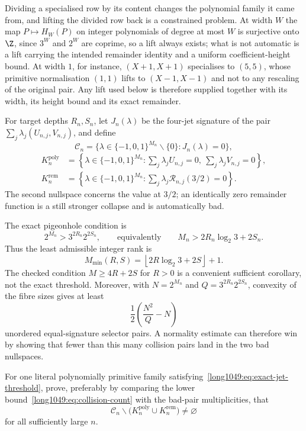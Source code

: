 Dividing a specialised row by its content changes the polynomial family it came
from, and lifting the divided row back is a constrained problem.  At width $W$ the map $P\mapsto H_W(P)$ on integer polynomials of
degree at most $W$ is surjective onto $\Z$, since $3^{W}$ and $2^{W}$ are
coprime, so a lift always exists; what is not automatic is a lift carrying the
intended remainder identity and a uniform coefficient-height bound.  At width
$1$, for instance, $(X+1,X+1)$ specialises to $(5,5)$, whose primitive
normalisation $(1,1)$ lifts to $(X-1,X-1)$ and not to any rescaling of the
original pair.  Any lift used below is therefore supplied together with its
width, its height bound and its exact remainder.

For target depths $R_n,S_n$, let $J_n(\lambda)$ be the four-jet signature of
the pair $\sum_j\lambda_j(U_{n,j},V_{n,j})$, and define
\[
 \mathcal C_n=
 \{\lambda\in\{-1,0,1\}^{M_n}\mathbin{\backslash}\{0\}:J_n(\lambda)=0\},
\]
\[
\begin{aligned}
 K_n^{\mathrm{poly}}
   &=\left\{\lambda\in\{-1,0,1\}^{M_n}:
       \sum_j\lambda_jU_{n,j}=0,\ \sum_j\lambda_jV_{n,j}=0\right\},\\
 K_n^{\mathrm{rem}}
   &=\left\{\lambda\in\{-1,0,1\}^{M_n}:
       \sum_j\lambda_j\mathcal R_{n,j}(3/2)=0\right\}.
\end{aligned}
\]
The second nullspace concerns the value at $3/2$; an identically zero
remainder function is a still stronger collapse and is automatically bad.

The exact pigeonhole condition is
\[
 2^{M_n}>3^{2R_n}2^{2S_n},
 \qquad\text{equivalently}\qquad
 M_n>2R_n\log_2 3+2S_n.
\tag{8.1}\label{long1049:eq:exact-jet-threshold}
\]
Thus the least admissible integer rank is
\[
 M_{\min}(R,S)=
 \left\lfloor2R\log_2 3+2S\right\rfloor+1.
\]
The checked condition $M\ge4R+2S$ for $R>0$ is a convenient sufficient
corollary, not the exact threshold.  Moreover, with
$N=2^{M_n}$ and $Q=3^{2R_n}2^{2S_n}$, convexity of the fibre sizes gives at
least
\[
 \frac12\left(\frac{N^2}{Q}-N\right)
\tag{8.2}\label{long1049:eq:collision-count}
\]
unordered equal-signature selector pairs.  A normality estimate can therefore
win by showing that fewer than this many collision pairs land in the two bad
nullspaces.

\begin{problem}\label{long1049:prob:escape}
For one literal polynomially primitive family
satisfying~\eqref{long1049:eq:exact-jet-threshold},
prove, preferably by comparing the lower bound~\eqref{long1049:eq:collision-count} with
the bad-pair multiplicities, that
\[
 \mathcal C_n\mathbin{\backslash}
 \bigl(K_n^{\mathrm{poly}}\cup K_n^{\mathrm{rem}}\bigr)
 \ne\varnothing
\]
for all sufficiently large $n$.
\end{problem}


